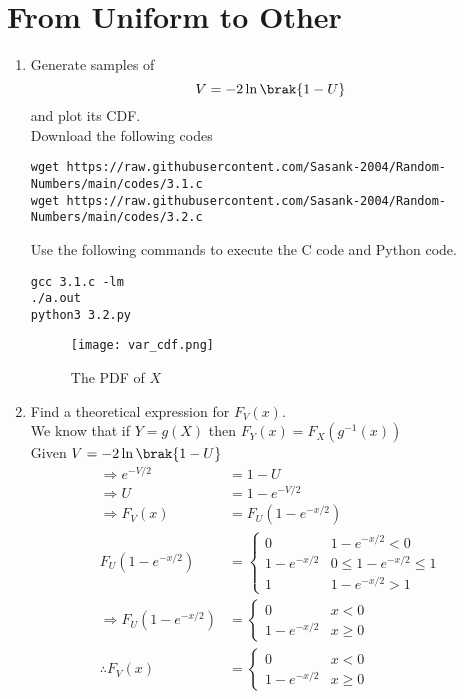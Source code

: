 \documentclass[journal,12pt,twocolumn]{IEEEtran}
\renewcommand\thesection{\arabic{section}}
\begin{document}
\section{From Uniform to Other}
\begin{enumerate}[label=\thesection.\arabic*
,ref=\thesection.\theenumi]
%
\item
Generate samples of 
%
\begin{equation}
V = -2\ln\brak{1-U}
\end{equation}
%
and plot its CDF.  \\
\solution Download the following codes
\begin{lstlisting}
wget https://raw.githubusercontent.com/Sasank-2004/Random-Numbers/main/codes/3.1.c
wget https://raw.githubusercontent.com/Sasank-2004/Random-Numbers/main/codes/3.2.c
\end{lstlisting}
Use the following commands to execute the C code and Python code.
\begin{lstlisting}
gcc 3.1.c -lm
./a.out
python3 3.2.py
\end{lstlisting}
\begin{figure}[h]
\centering
\texttt{[image: var\_cdf.png]}
\caption{The PDF of $X$}
\label{fig:var_cdf}
\end{figure}
\item Find a theoretical expression for $F_V(x)$.\\
\solution We know that if $Y=g(X)$ then $F_Y(x) = F_X(g^{-1}(x))$ \\
Given $V = -2\ln\brak{1-U}$
\begin{align}
    \Rightarrow e^{-V/2} &= 1 -U \\
    \Rightarrow U &= 1 - e^{-V/2} \\
    \Rightarrow F_V(x) &= F_U(1-e^{-x/2}) \\
    F_U(1-e^{-x/2}) &= 
    \begin{cases}
    0 &   1-e^{-x/2} < 0 \\
    1-e^{-x/2} &  0 \le 1-e^{-x/2} \le 1 \\
    1 &  1-e^{-x/2} > 1
    \end{cases} \\
    \Rightarrow  F_U(1-e^{-x/2}) &= 
    \begin{cases}
    0 & x < 0 \\
    1-e^{-x/2} & x \ge 0 
    \end{cases}\\
    \therefore F_V(x) &= 
    \begin{cases}
    0 & x < 0 \\
    1-e^{-x/2} & x \ge 0 
    \end{cases}
\end{align}


%
\end{enumerate}
\end{document}
